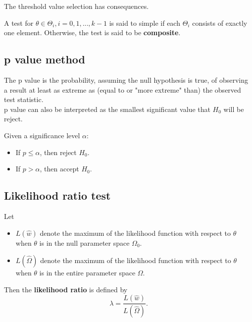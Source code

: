 \begin{refsection}
\begin{remark}
\begin{itemize}
	\end{itemize}  
\end{remark}

The threshold value selection has consequences.

\begin{definition}
	A test for $\theta\in \Theta_i,i=0,1,...,k-1$ is said to simple if each $\Theta_i$ consists of exactly one element. Otherwise, the test is said to be \textbf{composite}. 
\end{definition}



\subsection{p value method}
\begin{definition}[p value]
The p value is the probability, assuming the null hypothesis is true, of observing a result at least as extreme as (equal to or "more extreme" than) the observed test statistic. \\
p value can also be interpreted as the smallest significant value that $H_0$ will be reject.
\end{definition}

\begin{remark}
Given a significance level $\alpha$:
\begin{itemize}
	\item If $p \leq \alpha$, then reject $H_0$.
	\item If $p > \alpha$, then accept $H_0$.
\end{itemize} 	
\end{remark}


\subsection{Likelihood ratio test}

\begin{definition}
Let
\begin{itemize}
	\item $L(\hat{w})$ denote the maximum of the likelihood function with respect to $\theta$ when $\theta$ is in the null parameter space $\Omega_0$.
	\item $L(\hat{\Omega})$ denote the maximum of the likelihood function with respect to $\theta$ when $\theta$ is in the entire parameter space $\Omega$. 
\end{itemize}	
Then the \textbf{likelihood ratio} is defined by
$$\lambda = \frac{L(\hat{w})}{L(\hat{\Omega})}.$$


\end{definition}
\end{refsection}
